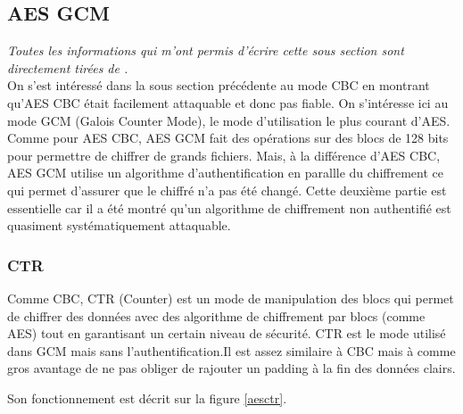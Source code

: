 \documentclass[a4paper, 12pt]{article}
\begin{document}
\subsection{AES GCM}
\noindent\emph{Toutes les informations qui m'ont permis d'écrire cette sous section sont directement tirées de \cite{courscourt}.}\\


On s'est intéressé dans la sous section précédente au mode CBC en montrant qu'AES CBC était facilement attaquable et donc pas fiable. On s'intéresse ici au mode GCM (Galois Counter Mode), le mode d'utilisation le plus courant d'AES. Comme pour AES CBC, AES GCM fait des opérations sur des blocs de 128 bits pour permettre de chiffrer de grands fichiers. Mais, à la différence d'AES CBC, AES GCM utilise un algorithme d'authentification en parallle du chiffrement ce qui permet d'assurer que le chiffré n'a pas été changé. Cette deuxième partie est essentielle car il a été montré qu'un algorithme de chiffrement non authentifié est quasiment systématiquement attaquable.

\subsubsection{CTR} \label{CTR}
Comme CBC, CTR (Counter) est un mode de manipulation des blocs qui permet de chiffrer des données avec des algorithme de chiffrement par blocs (comme AES) tout en garantisant un certain niveau de sécurité. CTR est le mode utilisé dans GCM mais sans l'authentification.Il est assez similaire à CBC mais à comme gros avantage de ne pas obliger de rajouter un padding à la fin des données clairs.

Son fonctionnement est décrit sur la figure \ref{aesctr}. 
\end{document}
